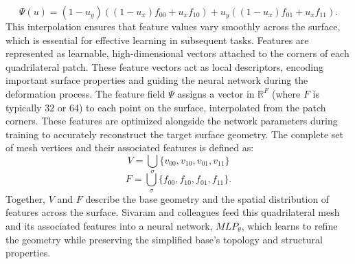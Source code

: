 \[\Psi(u) = (1 - u_y)((1 - u_x)f_{00} + u_x f_{10}) + u_y((1 - u_x)f_{01} + u_x f_{11}).\]
This interpolation ensures that feature values vary smoothly across the surface, which is essential for effective learning in subsequent tasks. 
Features are represented as learnable, high-dimensional vectors attached to the corners of each quadrilateral patch. 
These feature vectors act as local descriptors, encoding important surface properties and guiding the neural network during the deformation process. 
The feature field \( \Psi \) assigns a vector in \( \mathbb{R}^F \) (where \( F \) is typically 32 or 64) to each point on the surface, interpolated from the patch corners. 
These features are optimized alongside the network parameters during training to accurately reconstruct the target surface geometry. 
The complete set of mesh vertices and their associated features is defined as: 
\[V = \bigcup_{\sigma} \{ v_{00}, v_{10}, v_{01}, v_{11} \}\]
\[F = \bigcup_{\sigma} \{ f_{00}, f_{10}, f_{01}, f_{11} \}.\]
Together, \( V \) and \( F \) describe the base geometry and the spatial distribution of features across the surface. 
Sivaram and colleagues feed this quadrilateral mesh and its associated features into a neural network, \( MLP_\theta \), which learns to refine the geometry while preserving the simplified base’s topology and structural properties.









%    
